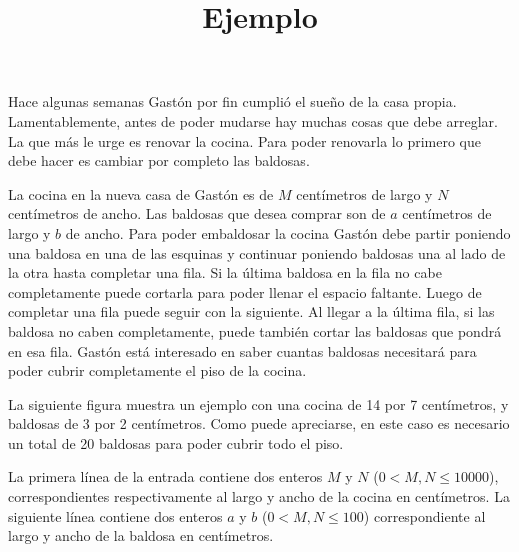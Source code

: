 \documentclass{oci}
\title{Ejemplo}
\begin{document}
\begin{problemDescription}
  Hace algunas semanas Gastón por fin cumplió el sueño de la casa propia.
  Lamentablemente, antes de poder mudarse hay muchas cosas que debe arreglar.
  La que más le urge es renovar la cocina.
  Para poder renovarla lo primero que debe hacer es cambiar por completo las
  baldosas.

  La cocina en la nueva casa de Gastón es de $M$ centímetros de largo y $N$
  centímetros de ancho.
  Las baldosas que desea comprar son de $a$ centímetros de largo y $b$ de ancho.
  Para poder embaldosar la cocina Gastón debe partir poniendo una baldosa en una
  de las esquinas y continuar poniendo baldosas una al lado de la otra hasta
  completar una fila.
  Si la última baldosa en la fila no cabe completamente puede cortarla para
  poder llenar el espacio faltante.
  Luego de completar una fila puede seguir con la siguiente.
  Al llegar a la última fila, si las baldosa no caben completamente, puede
  también cortar las baldosas que pondrá en esa fila.
  Gastón está interesado en saber cuantas baldosas necesitará para poder cubrir
  completamente el piso de la cocina.

  La siguiente figura muestra un ejemplo con una cocina de 14 por 7 centímetros,
  y baldosas de 3 por 2 centímetros.
  Como puede apreciarse, en este caso es necesario un total de 20 baldosas para
  poder cubrir todo el piso.
  \begin{center}
  \end{center}
\end{problemDescription}

\begin{inputDescription}
  La primera línea de la entrada contiene dos enteros $M$ y $N$ ($0 < M, N \leq
  10000$), correspondientes respectivamente al largo y ancho de la cocina en
  centímetros.
  La siguiente línea contiene dos enteros $a$ y $b$ ($0 < M, N \leq 100$)
  correspondiente al largo y ancho de la baldosa en centímetros.
\end{inputDescription}
\end{document}

